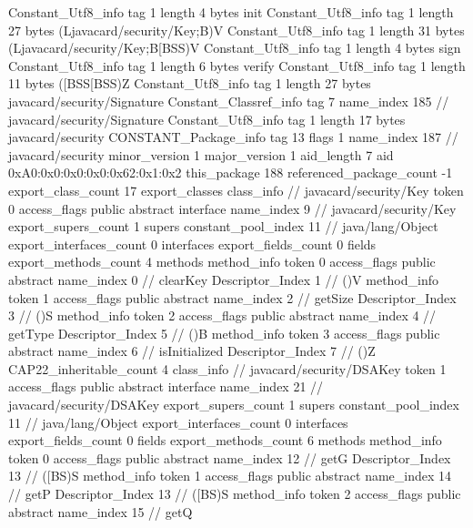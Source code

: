 {{{		}
		Constant_Utf8_info {
			tag	1
			length	4
			bytes	init
		}
		Constant_Utf8_info {
			tag	1
			length	27
			bytes	(Ljavacard/security/Key;B)V
		}
		Constant_Utf8_info {
			tag	1
			length	31
			bytes	(Ljavacard/security/Key;B[BSS)V
		}
		Constant_Utf8_info {
			tag	1
			length	4
			bytes	sign
		}
		Constant_Utf8_info {
			tag	1
			length	6
			bytes	verify
		}
		Constant_Utf8_info {
			tag	1
			length	11
			bytes	([BSS[BSS)Z
		}
		Constant_Utf8_info {
			tag	1
			length	27
			bytes	javacard/security/Signature
		}
		Constant_Classref_info {
			tag	7
			name_index	185		// javacard/security/Signature
		}
		Constant_Utf8_info {
			tag	1
			length	17
			bytes	javacard/security
		}
		CONSTANT_Package_info {
			tag	13
			flags	1
			name_index	187		// javacard/security
			minor_version	1
			major_version	1
			aid_length	7
			aid	0xA0:0x0:0x0:0x0:0x62:0x1:0x2
		}
	}
	this_package	188
	referenced_package_count	-1
	export_class_count	17
	export_classes {
		class_info {		// javacard/security/Key
			token	0
			access_flags	public abstract interface
			name_index	9		// javacard/security/Key
			export_supers_count	1
			supers {
				constant_pool_index	11		// java/lang/Object
			}
			export_interfaces_count	0
			interfaces {
			}
			export_fields_count	0
			fields {
			}
			export_methods_count	4
			methods {
				method_info {
					token	0
					access_flags	public abstract
					name_index	0		// clearKey
					Descriptor_Index	1		// ()V
				}
				method_info {
					token	1
					access_flags	public abstract
					name_index	2		// getSize
					Descriptor_Index	3		// ()S
				}
				method_info {
					token	2
					access_flags	public abstract
					name_index	4		// getType
					Descriptor_Index	5		// ()B
				}
				method_info {
					token	3
					access_flags	public abstract
					name_index	6		// isInitialized
					Descriptor_Index	7		// ()Z
				}
			}
			CAP22_inheritable_count	4
		}
		class_info {		// javacard/security/DSAKey
			token	1
			access_flags	public abstract interface
			name_index	21		// javacard/security/DSAKey
			export_supers_count	1
			supers {
				constant_pool_index	11		// java/lang/Object
			}
			export_interfaces_count	0
			interfaces {
			}
			export_fields_count	0
			fields {
			}
			export_methods_count	6
			methods {
				method_info {
					token	0
					access_flags	public abstract
					name_index	12		// getG
					Descriptor_Index	13		// ([BS)S
				}
				method_info {
					token	1
					access_flags	public abstract
					name_index	14		// getP
					Descriptor_Index	13		// ([BS)S
				}
				method_info {
					token	2
					access_flags	public abstract
					name_index	15		// getQ
}}}}}
